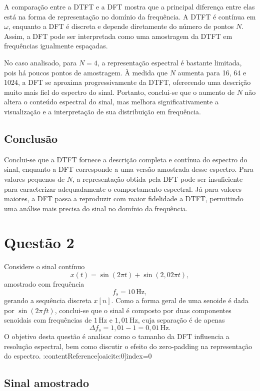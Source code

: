 \documentclass[12pt,a4paper]{article}
\begin{document}
A comparação entre a DTFT e a DFT mostra que a principal diferença entre elas está na forma de representação no domínio da frequência. A DTFT é contínua em \(\omega\), enquanto a DFT é discreta e depende diretamente do número de pontos \(N\). Assim, a DFT pode ser interpretada como uma amostragem da DTFT em frequências igualmente espaçadas.

No caso analisado, para \(N=4\), a representação espectral é bastante limitada, pois há poucos pontos de amostragem. À medida que \(N\) aumenta para 16, 64 e 1024, a DFT se aproxima progressivamente da DTFT, oferecendo uma descrição muito mais fiel do espectro do sinal. Portanto, conclui-se que o aumento de \(N\) não altera o conteúdo espectral do sinal, mas melhora significativamente a visualização e a interpretação de sua distribuição em frequência.

\subsection{Conclusão}

Conclui-se que a DTFT fornece a descrição completa e contínua do espectro do sinal, enquanto a DFT corresponde a uma versão amostrada desse espectro. Para valores pequenos de \(N\), a representação obtida pela DFT pode ser insuficiente para caracterizar adequadamente o comportamento espectral. Já para valores maiores, a DFT passa a reproduzir com maior fidelidade a DTFT, permitindo uma análise mais precisa do sinal no domínio da frequência.

\section{Questão 2}

Considere o sinal contínuo
\[
x(t)=\sin(2\pi t)+\sin(2{,}02\pi t),
\]
amostrado com frequência
\[
f_s=10\,\text{Hz},
\]
gerando a sequência discreta \(x[n]\). Como a forma geral de uma senoide é dada por \(\sin(2\pi f t)\), conclui-se que o sinal é composto por duas componentes senoidais com frequências de \(1\,\text{Hz}\) e \(1{,}01\,\text{Hz}\), cuja separação é de apenas
\[
\Delta f_s = 1{,}01-1=0{,}01\,\text{Hz}.
\]
O objetivo desta questão é analisar como o tamanho da DFT influencia a resolução espectral, bem como discutir o efeito do zero-padding na representação do espectro. :contentReference[oaicite:0]{index=0}

\subsection{Sinal amostrado}
\end{document}
